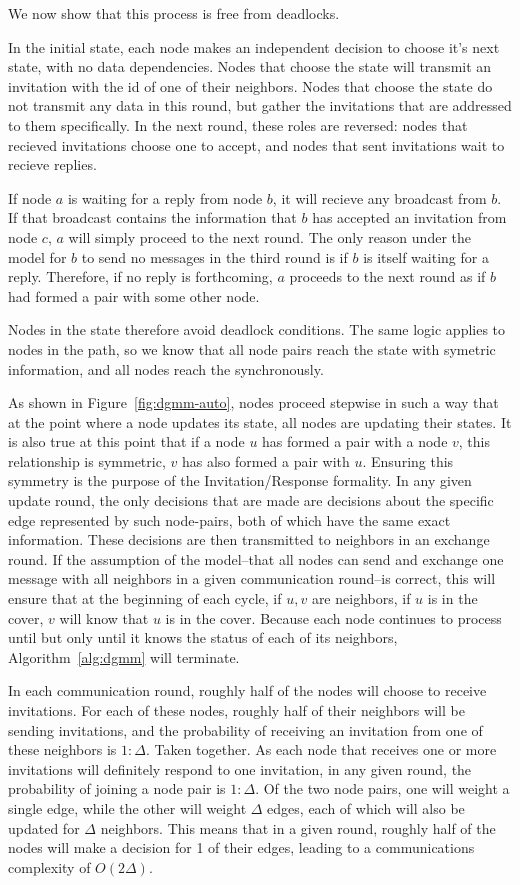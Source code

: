 We now show that this process is free from deadlocks. 

In the initial state, each node makes an independent decision to choose it's next state, with no data dependencies. Nodes that choose the \cId state will transmit an invitation with the id of one of their neighbors. Nodes that choose the \cLd state do not transmit any data in this round, but gather the invitations that are addressed to them specifically. In the next round, these roles are reversed: nodes that recieved invitations choose one to accept, and nodes that sent invitations wait to recieve replies.

If node $a$ is waiting for a reply from node $b$, it will recieve any broadcast from $b$. If that broadcast contains the information that $b$ has accepted an invitation from node $c$, $a$ will simply proceed to the next round. The only reason under the model for $b$ to send no messages in the third round is if $b$ is itself waiting for a reply. Therefore, if no reply is forthcoming, $a$ proceeds to the next round as if $b$ had formed a pair with some other node.

Nodes in the \cId state therefore avoid deadlock conditions. The same logic applies to nodes in the \cId path, so we know that all node pairs reach the \cUd state with symetric information, and all nodes reach the \cUd synchronously.


 As shown in Figure~\ref{fig:dgmm-auto}, nodes proceed stepwise in such a way that at the point where a node updates its state, all nodes are updating their states. It is also true at this point that if a node $u$ has formed a pair with a node $v$, this relationship is symmetric, $v$ has also formed a pair with $u$. Ensuring this symmetry is the purpose of the Invitation/Response formality. In any given update round, the only decisions that are made are decisions about the specific edge represented by such node-pairs, both of which have the same exact information. These decisions are then transmitted to neighbors in an exchange round. If the assumption of the model--that all nodes can send and exchange one message with all neighbors in a given communication round--is correct, this will ensure that at the beginning of each cycle, if $u,v$ are neighbors, if $u$ is in the cover, $v$ will know that $u$ is in the cover. Because each node continues to process until but only until it knows the status of each of its neighbors, Algorithm~\ref{alg:dgmm} will terminate.

In each communication round, roughly half of the nodes will choose to receive invitations. For each of these nodes, roughly half of their neighbors will be sending invitations, and the probability of receiving an invitation from one of these neighbors is $1:\Delta$. Taken together. As each node that receives one or more invitations will definitely respond to one invitation, in any given round, the probability of joining a node pair is $1:\Delta$. Of the two node pairs, one will weight a single edge, while the other will weight $\Delta$ edges, each of which will also be updated for $\Delta$ neighbors. This means that in a given round, roughly half of the nodes will make a decision for 1 of their edges, leading to a communications complexity of $O(2\Delta)$.